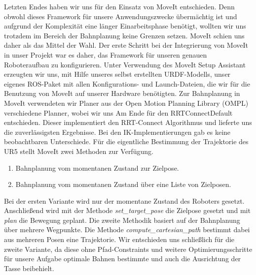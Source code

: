 \newline
Letzten Endes haben wir uns für den Einsatz von MoveIt entschieden. Denn obwohl dieses Framework für unsere Anwendungszwecke übermächtig ist und aufgrund der Komplexität eine länger Einarbeitsphase benötigt, wollten wir uns trotzdem im Bereich der Bahnplanung keine Grenzen setzen. MoveIt schien uns daher als das Mittel der Wahl.
\newline
Der erste Schritt bei der Integrierung von MoveIt in unser Projekt war es daher, das Framework für unseren genauen Roboteraufbau zu konfigurieren. Unter Verwendung des MoveIt Setup Assistant \cite{MoveItAssistant} erzeugten wir uns, mit Hilfe unseres selbst erstellten URDF-Modells, unser eigenes ROS-Paket mit allen Konfigurations- und Launch-Dateien, die wir für die Benutzung von MoveIt auf unserer Hardware benötigten.
\newline
Zur Bahnplanung in MoveIt verwendeten wir Planer aus der Open Motion Planning Library (OMPL) verschiedene Planner, wobei wir uns Am Ende für den RRTConnectDefault entschieden. Dieser implementiert den RRT-Connect Algorithmus und lieferte uns die zuverlässigsten Ergebnisse. Bei den IK-Implementierungen gab es keine beobachtbaren Unterschiede.
\newline
Für die eigentliche Bestimmung der Trajektorie des UR5 stellt MoveIt zwei Methoden zur Verfügung.
\begin{enumerate}
	\item Bahnplanung vom momentanen Zustand zur Zielpose.
	\item Bahnplanung vom momentanen Zustand über eine Liste von Zielposen.
\end{enumerate}
Bei der ersten Variante wird nur der momentane Zustand des Roboters gesetzt. Anschließend wird mit der Methode \textit{set_target_pose} die Zielpose gesetzt und mit \textit{plan} die Bewegung geplant. Die zweite Methodik basiert auf der Bahnplanung über mehrere Wegpunkte. Die Methode \textit{compute_cartesian_path} bestimmt dabei aus mehreren Posen eine Trajektorie. Wir entschieden uns schließlich für die zweite Variante, da diese ohne Pfad-Constraints und weitere Optimierungsschritte für unsere Aufgabe optimale Bahnen bestimmte und auch die Ausrichtung der Tasse beibehielt.
